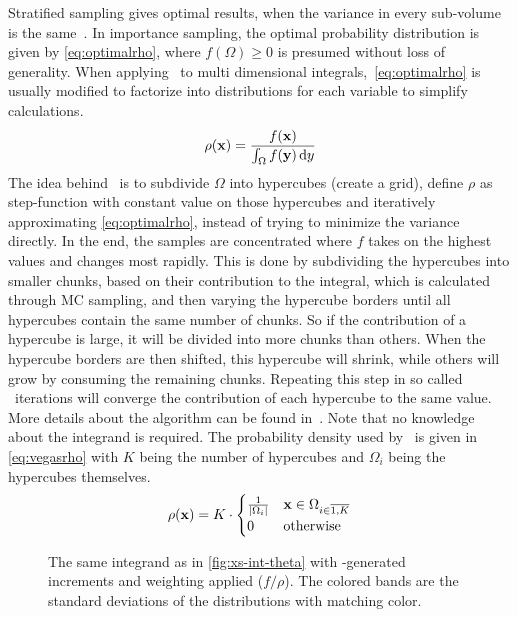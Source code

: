 Stratified sampling gives optimal results, when the variance in every
sub-volume is the same~\cite{Lepage:19781an}. In importance sampling,
the optimal probability distribution is given
by \cref{eq:optimalrho}, where \(f(\Omega) \geq 0\) is presumed
without loss of generality. When applying \vegas\ to multi dimensional
integrals,~\cref{eq:optimalrho} is usually modified to factorize into
distributions for each variable to simplify calculations.
%
\begin{equation}
  \label{eq:optimalrho}
  \rho(\vb{x}) = \frac{f(\vb{x})}{\int_\Omega f(\vb{y})\dd{y}}
\end{equation}
%
The idea behind \vegas\ is to subdivide \(\Omega\) into hypercubes
(create a grid), define \(\rho\) as step-function with constant value
on those hypercubes and iteratively approximating
\cref{eq:optimalrho}, instead of trying to minimize the variance
directly. In the end, the samples are concentrated where \(f\) takes
on the highest values and changes most rapidly. This is done by
subdividing the hypercubes into smaller chunks, based on their
contribution to the integral, which is calculated through MC sampling,
and then varying the hypercube borders until all hypercubes contain
the same number of chunks.  So if the contribution of a hypercube is
large, it will be divided into more chunks than others. When the
hypercube borders are then shifted, this hypercube will shrink, while
others will grow by consuming the remaining chunks.  Repeating this
step in so called \vegas\ iterations will converge the contribution of
each hypercube to the same value. More details about the algorithm can
be found in~\cite{Lepage:19781an}.  Note that no knowledge about the
integrand is required. The probability density used by \vegas\ is
given in \cref{eq:vegasrho} with \(K\) being the number of hypercubes
and \(\Omega_i\) being the hypercubes themselves.
%
\begin{equation}
  \label{eq:vegasrho}
  \rho(\vb{x}) = K\cdot
  \begin{cases}
    \frac{1}{\abs{\Omega_i}} & \vb{x}\in\Omega_{i\in\overline{1,K}} \\
    0 & \text{otherwise}
  \end{cases}
\end{equation}
%
\begin{figure}[ht]
  \centering {}
  \caption[\(2\pi\dv{\sigma}{\theta}\) scaled to increments found by
  \vegas\ ]{\label{fig:xs-int-vegas} The same integrand as in
    \cref{fig:xs-int-theta} with \vegas-generated increments and
    weighting applied (\(f/\rho\)). The colored bands are the standard
    deviations of the distributions with matching color.}
\end{figure}
